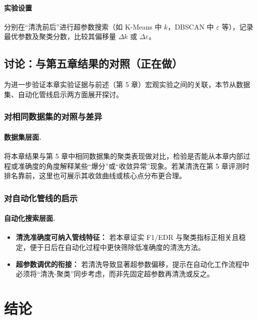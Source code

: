 \documentclass[10pt]{article} %
\numberwithin{equation}{section}
\begin{document}
\paragraph{实验设置}
分别在“清洗前后”进行超参数搜索（如 K-Means 中 $k$，DBSCAN 中 $\varepsilon$ 等），记录最优参数及聚类分数，比较其偏移量 \(\Delta k\) 或 \(\Delta \varepsilon\)。

\subsection{讨论：与第五章结果的对照（正在做）}
\label{sec:discussion}

为进一步验证本章实验证据与前述（第 5 章）宏观实验之间的关联，本节从数据集、自动化管线启示两方面展开探讨。

\subsubsection{对相同数据集的对照与差异}
\label{subsec:discussion_data}

\paragraph{数据集层面.}
将本章结果与第 5 章中相同数据集的聚类表现做对比，检验是否能从本章内部过程或准确度的角度解释某些“爆分”或“收敛异常”现象。若某清洗在第 5 章评测时排名靠前，这里也可展示其收敛曲线或核心点分布更合理。

\subsubsection{对自动化管线的启示}
\label{subsec:discussion_automl}

\paragraph{自动化搜索层面.}
\begin{itemize}
    \item \textbf{清洗准确度可纳入管线特征：}
    若本章证实 F1/EDR 与聚类指标正相关且稳定，便于日后在自动化过程中更快筛除低准确度的清洗方法。
    \item \textbf{超参数调优的衔接：}
    若清洗导致显著超参数偏移，提示在自动化工作流程中必须将“清洗-聚类”同步考虑，而非先固定超参数再清洗或反之。
\end{itemize}



\section{结论}
\label{sec:conclusion}
\end{document}
